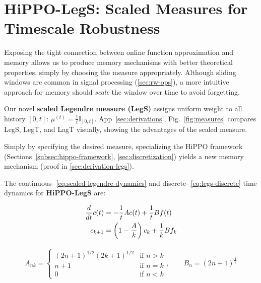 
\section{HiPPO-LegS: Scaled Measures for Timescale Robustness}
\label{sec:theory_legs}

Exposing the tight connection between online function approximation and memory allows us to produce memory mechanisms with better theoretical properties, simply by choosing the measure appropriately.
Although sliding windows are common in signal processing (\cref{sec:rw-ops}), a more intuitive approach for memory should \emph{scale} the window over time to avoid forgetting.

Our novel \textbf{scaled Legendre measure (LegS)} assigns uniform weight to all history $[0, t]$:
$\mu^{(t)} = \frac{1}{t} \mathbb{I}_{[0, t]}$. %
App~\ref{sec:derivations}, Fig.~\ref{fig:measures} compares LegS, LegT, and LagT visually, showing the advantages of the scaled measure.


Simply by specifying the desired measure, specializing the HiPPO framework (Sections~\ref{subsec:hippo-framework}, \ref{sec:discretization})
yields a new memory mechanism (proof in \cref{sec:derivation-legs}).
\begin{theorem}
  \label{thm:legs}
  The continuous- \eqref{eq:scaled-legendre-dynamics}
  and discrete- \eqref{eq:legs-discrete} time dynamics for \textbf{HiPPO-LegS} are:
  \small

  \begin{minipage}{.35\linewidth}
    \begin{align}
      \frac{d}{d t} c(t) &= -\frac{1}{t} A c(t) + \frac{1}{t} B f(t)
      \label{eq:scaled-legendre-dynamics}
      \\
      c_{k+1} &= \left( 1-\frac{A}{k} \right) c_k + \frac{1}{k} B f_k
     \label{eq:legs-discrete}
    \end{align}
  \end{minipage}%
  \hfill
  \begin{minipage}{.52\linewidth}
    \begin{align*}
      A_{nk}
      =
      \begin{cases}
        (2n+1)^{1/2}(2k+1)^{1/2} & \mbox{if } n > k \\
        n+1 & \mbox{if } n = k \\
        0 & \mbox{if } n < k
      \end{cases},
      \qquad
      B_n = (2n+1)^{\frac{1}{2}}
    \end{align*}
  \end{minipage}
\end{theorem}

